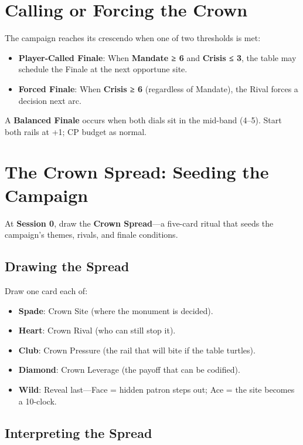 \section*{Calling or Forcing the Crown}

The campaign reaches its crescendo when one of two thresholds is met:

\begin{itemize}
    \item \textbf{Player-Called Finale}: When \textbf{Mandate ≥ 6} and \textbf{Crisis ≤ 3}, the table may schedule the Finale at the next opportune site.
    \item \textbf{Forced Finale}: When \textbf{Crisis ≥ 6} (regardless of Mandate), the Rival forces a decision next arc.
\end{itemize}

A \textbf{Balanced Finale} occurs when both dials sit in the mid-band (4–5). Start both rails at +1; CP budget as normal.

\section*{The Crown Spread: Seeding the Campaign}

At \textbf{Session 0}, draw the \textbf{Crown Spread}—a five-card ritual that seeds the campaign's themes, rivals, and finale conditions.

\subsection*{Drawing the Spread}

Draw one card each of:

\begin{itemize}
    \item \textbf{Spade}: Crown Site (where the monument is decided).
    \item \textbf{Heart}: Crown Rival (who can still stop it).
    \item \textbf{Club}: Crown Pressure (the rail that will bite if the table turtles).
    \item \textbf{Diamond}: Crown Leverage (the payoff that can be codified).
    \item \textbf{Wild}: Reveal last—Face = hidden patron steps out; Ace = the site becomes a 10-clock.
\end{itemize}

\subsection*{Interpreting the Spread}

